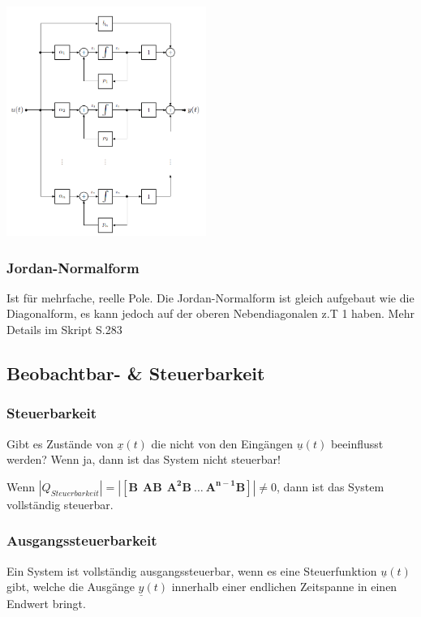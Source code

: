 \begin{multicols}{2}
\columnbreak

  \includegraphics[width=6.5cm]{./images/zrd-diagonalform}
\end{multicols}

\subsubsection{Jordan-Normalform}
  Ist für mehrfache, reelle Pole. Die Jordan-Normalform ist gleich aufgebaut wie die Diagonalform, 
  es kann jedoch auf der oberen Nebendiagonalen z.T 1 haben. 
  Mehr Details im Skript S.283



\subsection{Beobachtbar- \& Steuerbarkeit }
\subsubsection{Steuerbarkeit }
Gibt es Zustände von $\underline{x} (t)$ die nicht von den
Eingängen $\underline{u} (t)$ beeinflusst werden? Wenn ja,
dann ist das System nicht steuerbar!

Wenn $|Q_{Steuerbarkeit}|= \left| \left [ \boldsymbol{B~~AB~~ A^2B~\ldots~
A^{n-1}B} \right ] \right|  \neq 0$, dann ist das System vollständig steuerbar.

\subsubsection{Ausgangssteuerbarkeit}
Ein System ist vollständig ausgangssteuerbar, wenn es eine Steuerfunktion $\underline{u} (t)$ gibt,
welche die Ausgänge $\underline{y}(t)$ innerhalb einer endlichen Zeitspanne in einen Endwert bringt.

